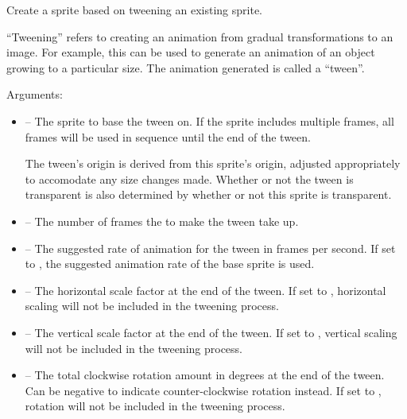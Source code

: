 \documentclass[letterpaper,10pt,english]{sphinxmanual}
\begin{document}

\begin{fulllineitems}
\label{gfx:sge.gfx.Sprite.from_tween}
Create a sprite based on tweening an existing sprite.

``Tweening'' refers to creating an animation from gradual
transformations to an image.  For example, this can be used to
generate an animation of an object growing to a particular size.
The animation generated is called a ``tween''.

Arguments:
\begin{itemize}
\item {} 
 -- The sprite to base the tween on.  If the sprite
includes multiple frames, all frames will be used in sequence
until the end of the tween.

The tween's origin is derived from this sprite's origin,
adjusted appropriately to accomodate any size changes made.
Whether or not the tween is transparent is also determined by
whether or not this sprite is transparent.

\item {} 
 -- The number of frames the to make the tween take
up.

\item {} 
 -- The suggested rate of animation for the tween in
frames per second.  If set to , the suggested
animation rate of the base sprite is used.

\item {} 
 -- The horizontal scale factor at the end of the
tween.  If set to , horizontal scaling will not
be included in the tweening process.

\item {} 
 -- The vertical scale factor at the end of the
tween.  If set to , vertical scaling will not be
included in the tweening process.

\item {} 
 -- The total clockwise rotation amount in degrees
at the end of the tween.  Can be negative to indicate
counter-clockwise rotation instead.  If set to ,
rotation will not be included in the tweening process.


\end{itemize}
\end{fulllineitems}
\end{document}
